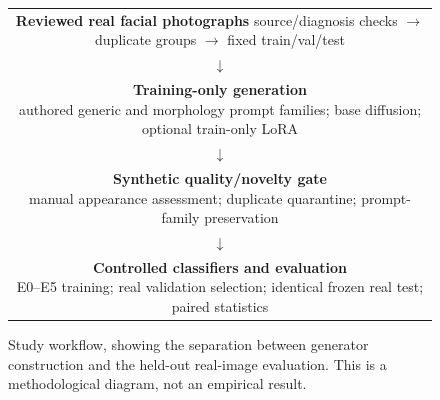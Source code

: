 \begin{figure}[ht]
\centering
\setlength{\fboxsep}{7pt}
\begin{tabular}{c}
\fbox{\parbox{0.83\linewidth}{\centering \textbf{Reviewed real facial photographs}\\
source/diagnosis checks $\rightarrow$ duplicate groups $\rightarrow$ fixed train/val/test}}\\[4pt]
$\downarrow$\\[-2pt]
\fbox{\parbox{0.83\linewidth}{\centering \textbf{Training-only generation}\\
authored generic and morphology prompt families; base diffusion; optional train-only LoRA}}\\[4pt]
$\downarrow$\\[-2pt]
\fbox{\parbox{0.83\linewidth}{\centering \textbf{Synthetic quality/novelty gate}\\
manual appearance assessment; duplicate quarantine; prompt-family preservation}}\\[4pt]
$\downarrow$\\[-2pt]
\fbox{\parbox{0.83\linewidth}{\centering \textbf{Controlled classifiers and evaluation}\\
E0--E5 training; real validation selection; identical frozen real test; paired statistics}}
\end{tabular}
\caption{Study workflow, showing the separation between generator construction and the held-out real-image evaluation. This is a methodological diagram, not an empirical result.}
\label{fig:workflow}
\end{figure}
